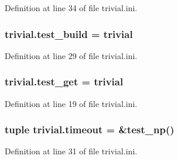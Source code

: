 Definition at line 34 of file trivial.\-ini.

\hypertarget{namespacetrivial_aa612b0f8daffd666959f885b6ba54cd0}{
\subsubsection[{test\-\_\-build}]{\setlength{\rightskip}{0pt plus 5cm}trivial.\-test\-\_\-build = trivial}}\label{namespacetrivial_aa612b0f8daffd666959f885b6ba54cd0}


Definition at line 29 of file trivial.\-ini.

\hypertarget{namespacetrivial_afe75cace659f04749ee3f7c818152b7b}{
\subsubsection[{test\-\_\-get}]{\setlength{\rightskip}{0pt plus 5cm}trivial.\-test\-\_\-get = trivial}}\label{namespacetrivial_afe75cace659f04749ee3f7c818152b7b}


Definition at line 19 of file trivial.\-ini.

\hypertarget{namespacetrivial_a8ce5c7e487f1c21edda391cc47830f5e}{
\subsubsection[{timeout}]{\setlength{\rightskip}{0pt plus 5cm}tuple trivial.\-timeout = \&test\-\_\-np()}}\label{namespacetrivial_a8ce5c7e487f1c21edda391cc47830f5e}


Definition at line 31 of file trivial.\-ini.


